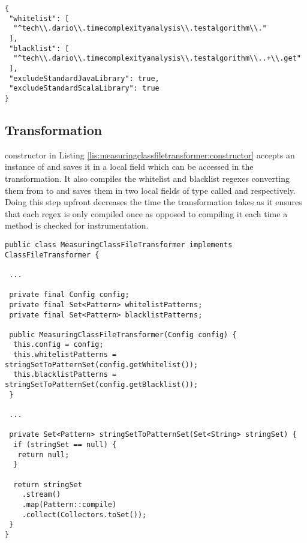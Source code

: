 \begin{lstlisting}[breaklines,caption={Configuration JSON file example},label=lis:config1,style=json]
{
 "whitelist": [
  "^tech\\.dario\\.timecomplexityanalysis\\.testalgorithm\\."
 ],
 "blacklist": [
  "^tech\\.dario\\.timecomplexityanalysis\\.testalgorithm\\..+\\.get"
 ],
 "excludeStandardJavaLibrary": true,
 "excludeStandardScalaLibrary": true
}
\end{lstlisting}

\subsection{Transformation}
\label{sec:implementation:agent:transformation}

 constructor in Listing \ref{lis:measuringclassfiletransformer:constructor} accepts an instance of  and saves it in a local field which can be accessed in the transformation. It also compiles the whitelist and blacklist regexes converting them from  to  and saves them in two local fields of type  called  and  respectively. Doing this step upfront decreases the time the transformation takes as it ensures that each regex is only compiled once as opposed to compiling it each time a method is checked for instrumentation.

\begin{lstlisting}[breaklines,caption={$MeasuringClassFileTransformer$ initialization},label=lis:measuringclassfiletransformer:constructor]
public class MeasuringClassFileTransformer implements ClassFileTransformer {

 ...

 private final Config config;
 private final Set<Pattern> whitelistPatterns;
 private final Set<Pattern> blacklistPatterns;

 public MeasuringClassFileTransformer(Config config) {
  this.config = config;
  this.whitelistPatterns = stringSetToPatternSet(config.getWhitelist());
  this.blacklistPatterns = stringSetToPatternSet(config.getBlacklist());
 }

 ...

 private Set<Pattern> stringSetToPatternSet(Set<String> stringSet) {
  if (stringSet == null) {
   return null;
  }

  return stringSet
    .stream()
    .map(Pattern::compile)
    .collect(Collectors.toSet());
 }
}
\end{lstlisting}


